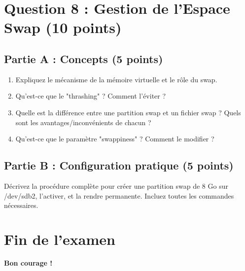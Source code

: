 \documentclass[12pt,a4paper]{article}
\begin{document}
\section{Question 8 : Gestion de l'Espace Swap (10 points)}

\begin{questionbox}
\subsection*{Partie A : Concepts (5 points)}
\begin{enumerate}[label=\alph*)]
    \item Expliquez le mécanisme de la mémoire virtuelle et le rôle du swap.
    \item Qu'est-ce que le "thrashing" ? Comment l'éviter ?
    \item Quelle est la différence entre une partition swap et un fichier swap ? Quels sont les avantages/inconvénients de chacun ?
    \item Qu'est-ce que le paramètre "swappiness" ? Comment le modifier ?
\end{enumerate}

\subsection*{Partie B : Configuration pratique (5 points)}
Décrivez la procédure complète pour créer une partition swap de 8 Go sur /dev/sdb2, l'activer, et la rendre permanente. Incluez toutes les commandes nécessaires.
\end{questionbox}

\newpage

\section*{Fin de l'examen}

\textbf{Bon courage !}
\end{document}
